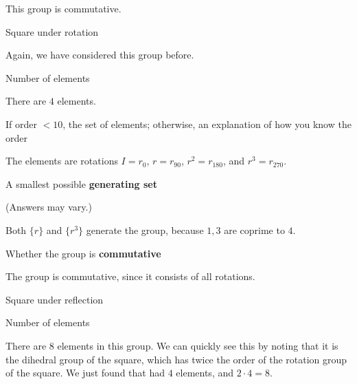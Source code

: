 \documentclass[../key.tex]{subfiles}
\begin{document}
\noindent This group is commutative.

\begin{outer_problem}
\item Square under rotation
\end{outer_problem}

\noindent Again, we have considered this group before.

\begin{inner_problem}[start=1]
\item Number of elements
\end{inner_problem}

\noindent There are $4$ elements.

\begin{inner_problem}
\item If order $< 10$, the set of elements; otherwise, an explanation of how you know the order
\end{inner_problem}

\noindent The elements are rotations $I=r_0$, $r=r_{90}$, $r^2=r_{180}$, and $r^3=r_{270}$.

\begin{inner_problem}
\item A smallest possible \textbf{generating set}
\end{inner_problem}

\noindent (Answers may vary.)

Both $\{r\}$ and $\{r^3\}$ generate the group, because $1,3$ are coprime to $4$.

\begin{inner_problem}
\item Whether the group is \textbf{commutative}
\end{inner_problem}

\noindent The group is commutative, since it consists of all rotations.

\begin{outer_problem}
\item Square under reflection
\end{outer_problem}

\begin{inner_problem}[start=1]
\item Number of elements
\end{inner_problem}

\noindent There are $8$ elements in this group. We can quickly see this by noting that it is the dihedral group of the square, which has twice the order of the rotation group of the square. We just found that had $4$ elements, and $2\cdot 4=8$.
\end{document}
